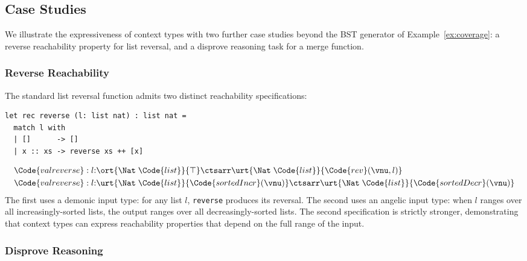 \subsection{Case Studies}\label{subsec:case-studies}

We illustrate the expressiveness of context types with two further
case studies beyond the BST generator of Example~\ref{ex:coverage}:
a reverse reachability property for list reversal, and a disprove
reasoning task for a merge function.

\subsubsection{Reverse Reachability}\label{subsubsec:reverse}

The standard list reversal function admits two distinct reachability
specifications:
\begin{lstlisting}
let rec reverse (l: list nat) : list nat =
  match l with
  | []      -> []
  | x :: xs -> reverse xs ++ [x]
\end{lstlisting}
\begin{align*}
  &\Code{val reverse} :
    l{:}\ort{\Nat\;\Code{list}}{\top} \ctsarr
    \urt{\Nat\;\Code{list}}{\Code{rev}(\vnu, l)}
  \\&\Code{val reverse} :
    l{:}\urt{\Nat\;\Code{list}}{\Code{sortedIncr}(\vnu)} \ctsarr
    \urt{\Nat\;\Code{list}}{\Code{sortedDecr}(\vnu)}
\end{align*}
The first uses a demonic input type: for any list $l$,
\texttt{reverse} produces its reversal.  The second uses an angelic
input type: when $l$ ranges over all increasingly-sorted lists, the
output ranges over all decreasingly-sorted lists.  The second
specification is strictly stronger, demonstrating that context types
can express reachability properties that depend on the full range of
the input.

\subsubsection{Disprove Reasoning}\label{subsubsec:disprove}


